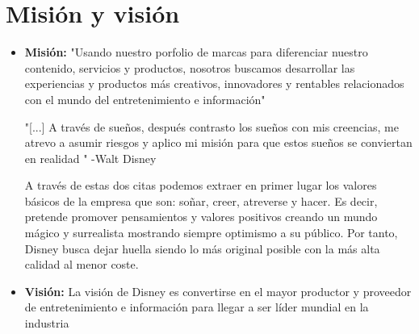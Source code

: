\section{Misión y visión}

\begin{itemize}

\item
\textbf{Misión:} "Usando nuestro porfolio de marcas para diferenciar nuestro contenido, servicios y productos, nosotros buscamos desarrollar las experiencias y productos más creativos, innovadores y rentables relacionados con el mundo del entretenimiento e información"

"[...] A través de sueños, después contrasto los sueños con mis creencias, me atrevo a asumir riesgos y aplico mi misión para que estos sueños se conviertan en realidad "
-Walt Disney

A través de estas dos citas podemos extraer en primer lugar los valores básicos de la empresa que son: soñar, creer, atreverse y hacer. Es decir, pretende promover pensamientos y valores positivos creando un mundo mágico y surrealista mostrando siempre optimismo a su público. Por tanto, Disney busca dejar huella siendo lo más original posible con la más alta calidad al menor coste.

\item
\textbf{Visión:} La visión de Disney es convertirse en el mayor productor y proveedor de entretenimiento e información para llegar a ser líder mundial en la industria

\end{itemize}